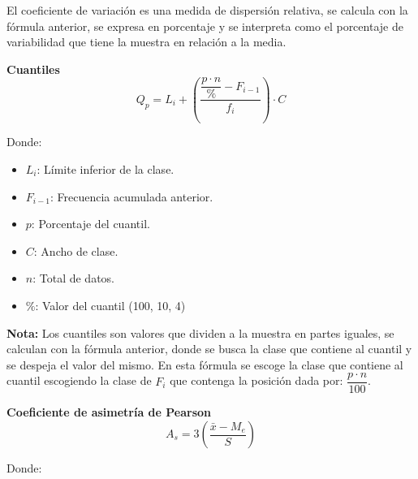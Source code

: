 \documentclass[11pt, a4paper]{article}
\newenvironment{coeficienteDeVariacion}{}{}
\newenvironment{cuantiles}{}{}
\newenvironment{asimetria}{}{}
\begin{document}
\begin{multicols}{2}
\begin{coeficienteDeVariacion}
        El coeficiente de variación es una medida de dispersión relativa, se calcula con la fórmula anterior, se expresa en porcentaje y se interpreta como el porcentaje de variabilidad que tiene la muestra en relación a la media.
    \end{coeficienteDeVariacion}
    \vspace{2cm}
    \begin{cuantiles}
        \begin{center}
            \textbf{\large Cuantiles}
            \hrulefill
            \begin{equation*}
                Q_p = L_i + \left( \dfrac{\dfrac{p \cdot n}{\%} - F_{i-1}}{f_i} \right) \cdot C
            \end{equation*}
        \end{center}
        \vspace{-1cm}
        Donde:
        \begin{itemize}
            \item $L_i$: Límite inferior de la clase.
            \item $F_{i-1}$: Frecuencia acumulada anterior.
            \item $p$: Porcentaje del cuantil.
            \item $C$: Ancho de clase.
            \item $n$: Total de datos.
            \item $\%$: Valor del cuantil (100, 10, 4)
        \end{itemize}
        \textbf{Nota:}
        Los cuantiles son valores que dividen a la muestra en partes iguales, se calculan con la fórmula anterior, donde se busca la clase que contiene al cuantil y se despeja el valor del mismo. En esta fórmula se escoge la clase que contiene al cuantil escogiendo la clase de $F_i$ que contenga la posición dada por: $\dfrac{p \cdot n}{100}$.
    \end{cuantiles}
    \begin{asimetria}
        \begin{center}
            \textbf{\large Coeficiente de asimetría de Pearson}
            \hrulefill
            \begin{equation*}
                A_s = 3\left(\dfrac{\bar{x} - M_e}{S}\right)
            \end{equation*}
        \end{center}
        \vspace{-1cm}
        Donde:
        \begin{itemize}

\end{itemize}
\end{asimetria}
\end{multicols}
\end{document}
